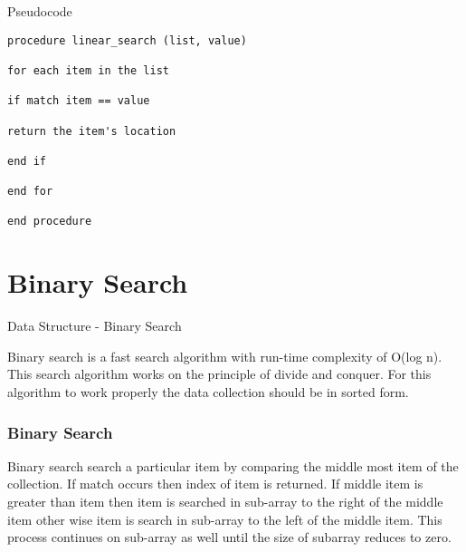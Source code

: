 \documentclass{beamer}
\begin{document}
\begin{frame}[fragile]
Pseudocode
\begin{verbatim}
procedure linear_search (list, value)

for each item in the list

if match item == value

return the item's location

end if

end for

end procedure 
\end{verbatim}

\end{frame}
\section{Binary Search}
\begin{frame}
Data Structure - Binary Search

Binary search is a fast search algorithm with run-time complexity of O(log n). This search algorithm works on the principle of divide and conquer. For this algorithm to work properly the data collection should be in sorted form.
\end{frame}

\begin{frame}
\frametitle{Binary Search}
\large
Binary search search a particular item by comparing the middle most item of the collection. If match occurs then index of item is returned. If middle item is greater than item then item is searched in sub-array to the right of the middle item other wise item is search in sub-array to the left of the middle item. This process continues on sub-array as well until the size of subarray reduces to zero.
\end{frame}
\end{document}
